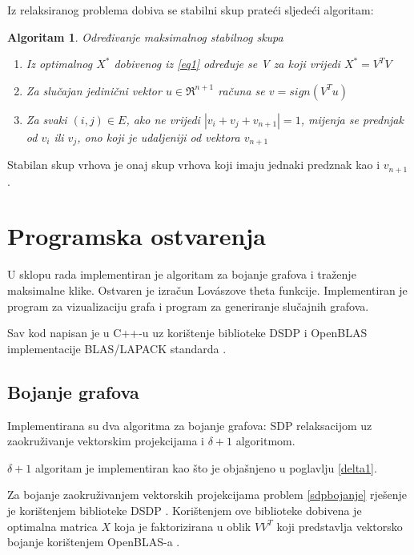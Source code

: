 \documentclass[diplomskirad]{fer}
\newtheorem{algoritam}{Algoritam}
\begin{document}
Iz relaksiranog problema dobiva se stabilni skup prateći sljedeći algoritam:
\begin{algoritam} Određivanje maksimalnog stabilnog skupa
  \label{maks_clique}
  \begin{enumerate}
    \item Iz optimalnog $X^*$ dobivenog iz \ref{eq1} određuje se V za koji vrijedi $X^* = V^TV$
    \item Za slučajan jedinični vektor $u \in \Re^{n+1}$ računa se $v = sign(V^Tu)$
    \item Za svaki $(i,j) \in E$, ako ne vrijedi $|v_i+v_j+v_{n+1}| = 1$, mijenja se prednjak od $v_i$ ili $v_j$, ono koji je udaljeniji
        od vektora $v_{n+1}$
  \end{enumerate}
\end{algoritam}

Stabilan skup vrhova je onaj skup vrhova koji imaju jednaki predznak kao i $v_{n+1}$.

\chapter{Programska ostvarenja}
\label{pog:programska_ostvarenja}

U sklopu rada implementiran je algoritam za bojanje grafova i traženje maksimalne klike.
Ostvaren je izračun Lovászove theta funkcije. %
Implementiran je program za vizualizaciju grafa i program za generiranje slučajnih grafova.

Sav kod napisan je u C++-u uz korištenje biblioteke DSDP \cite{dsdp-user-guide} i OpenBLAS implementacije BLAS/LAPACK standarda \cite{openBLAS}. %


\section{Bojanje grafova}
Implementirana su dva algoritma za bojanje grafova: SDP relaksacijom uz zaokruživanje vektorskim projekcijama i $\delta + 1$ algoritmom.

$\delta + 1$ algoritam je implementiran kao što je objašnjeno u poglavlju \ref{delta1}.

Za bojanje zaokruživanjem vektorskih projekcijama problem \ref{sdpbojanje} rješenje je korištenjem biblioteke DSDP \cite{dsdp-user-guide}.
Korištenjem ove biblioteke dobivena je optimalna matrica $X$ koja je faktorizirana u oblik $VV^T$ koji predstavlja vektorsko bojanje korištenjem
OpenBLAS-a \cite{openBLAS}.
\end{document}
